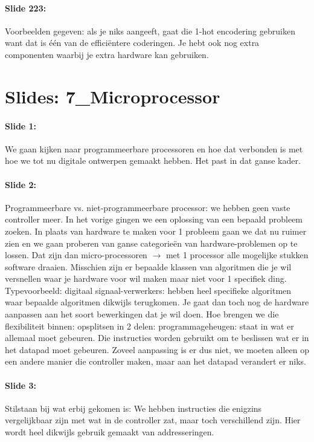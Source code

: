 \documentclass[10pt,a4paper]{book}
\begin{document}
\paragraph{Slide 223:} Voorbeelden gegeven: als je niks aangeeft, gaat die 1-hot encodering gebruiken want dat is \'e\'en van de effici\"entere coderingen. Je hebt ook nog extra componenten waarbij je extra hardware kan gebruiken. 

\section{Slides: 7\_Microprocessor} 

\paragraph{Slide 1:} We gaan kijken naar programmeerbare processoren en hoe dat verbonden is met hoe we tot nu digitale ontwerpen gemaakt hebben. Het past in dat ganse kader.

\paragraph{Slide 2:} Programmeerbare vs. niet-programmeerbare processor: we hebben geen vaste controller meer. In het vorige gingen we een oplossing van een bepaald probleem zoeken. In plaats van hardware te maken voor 1 probleem gaan we dat nu ruimer zien en we gaan proberen van ganse categorie\"en van hardware-problemen op te lossen. Dat zijn dan micro-processoren $\rightarrow$ met 1 processor alle mogelijke stukken software draaien. Misschien zijn er bepaalde klassen van algoritmen die je wil versnellen waar je hardware voor wil maken maar niet voor 1 specifiek ding. Typevoorbeeld: digitaal signaal-verwerkers: hebben heel specifieke algoritmen waar bepaalde algoritmen dikwijls terugkomen. Je gaat dan toch nog de hardware aanpassen aan het soort bewerkingen dat je wil doen. Hoe brengen we die flexibiliteit binnen: opsplitsen in 2 delen: programmageheugen: staat in wat er allemaal moet gebeuren. Die instructies worden gebruikt om te beslissen wat er in het datapad moet gebeuren. Zoveel aanpassing is er dus niet, we moeten alleen op een andere manier die controller maken, maar aan het datapad verandert er niks.

\paragraph{Slide 3:} Stilstaan bij wat erbij gekomen is: We hebben instructies die enigzins vergelijkbaar zijn met wat in de controller zat, maar toch verschillend zijn. Hier wordt heel dikwijls gebruik gemaakt van addresseringen.
\end{document}
